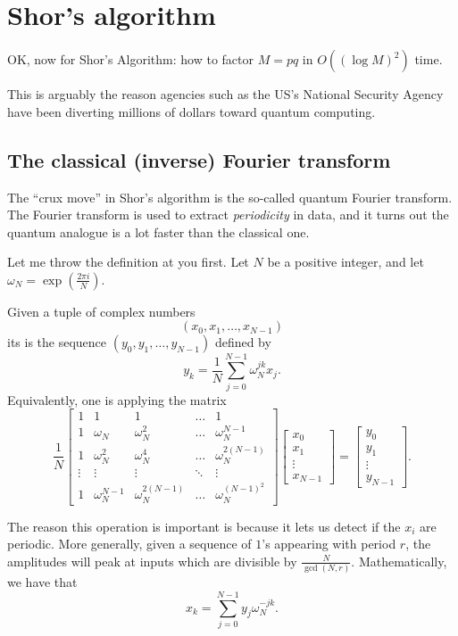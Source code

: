 \chapter{Shor's algorithm}
\label{ch:shors_algorithm}
OK, now for Shor's Algorithm:
how to factor $M = pq$ in $O\left( (\log M)^2 \right)$ time.

This is arguably the reason agencies such as the US's National
Security Agency have been diverting millions of dollars toward
quantum computing.

\section{The classical (inverse) Fourier transform}
The ``crux move'' in Shor's algorithm is the so-called
quantum Fourier transform.
The Fourier transform is used to extract \emph{periodicity} in data,
and it turns out the quantum analogue is a lot faster than the classical one.

Let me throw the definition at you first.
Let $N$ be a positive integer, and let $\omega_N = \exp\left( \frac{2\pi i}{N} \right)$.
\begin{definition}
	Given a tuple of complex numbers
	\[ \left( x_0, x_1, \dots, x_{N-1} \right) \]
	its  is
	the sequence $(y_0, y_1, \dots, y_{N-1})$ defined by
	\[ y_k = \frac1N \sum_{j=0}^{N-1} \omega_N^{jk} x_j. \]
	Equivalently, one is applying the matrix
	\[
		\frac 1N
		\begin{bmatrix}
			1 & 1 & 1 & \dots & 1 \\
			1 & \omega_N & \omega_N^2 & \dots & \omega_N^{N-1} \\
			1 & \omega_N^2 & \omega_N^4 & \dots & \omega_N^{2(N-1)} \\
			\vdots & \vdots & \vdots & \ddots & \vdots \\
			1 & \omega_N^{N-1} & \omega_N^{2(N-1)} & \dots & \omega_N^{(N-1)^2}
		\end{bmatrix}
		\begin{bmatrix} x_0 \\ x_1 \\ \vdots \\ x_{N-1} \end{bmatrix}
		=
		\begin{bmatrix} y_0 \\ y_1 \\ \vdots \\ y_{N-1} \end{bmatrix}.
	\]
\end{definition}
The reason this operation is important is because it lets
us detect if the $x_i$ are periodic.
More generally, given a sequence of $1$'s appearing with period $r$,
the amplitudes will peak at inputs which are divisible by $\frac{N}{\gcd(N,r)}$.
Mathematically, we have that
\[
	x_k = \sum_{j=0}^{N-1} y_j \omega_N^{-jk}.
\]

